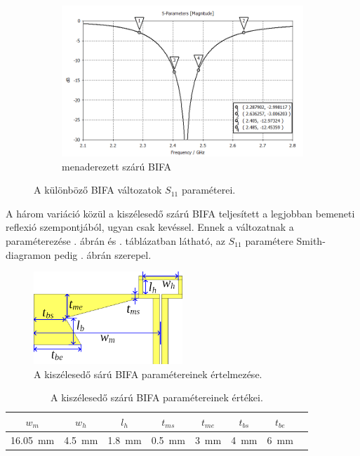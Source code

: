 \begin{figure}[h]
	\hfill
	\begin{subfigure}[b]{0.7\textwidth}
		\centering
		\includegraphics[width=\textwidth]{kep/results/bifa_meandered_S11_dB.png}
		\caption{menaderezett szárú BIFA}
	\end{subfigure}
	\caption{A különböző BIFA változatok $S_{11}$ paraméterei.}
	\label{fig:S11-dB}
\end{figure}
\par A három variáció közül a kiszélesedő szárú BIFA teljesített a legjobban bemeneti reflexió szempontjából, ugyan csak kevéssel. Ennek a változatnak a paraméterezése . ábrán és . táblázatban látható, az $S_{11}$ paramétere Smith-diagramon pedig . ábrán szerepel.
\begin{figure}[h!]
	\centering
	\includegraphics[width=0.5\textwidth]{kep/results/bifa_broadband_params.png}
	\caption{A kiszélesedő sárú BIFA paramétereinek értelmezése.}
	\label{fig:bifa-bb-param}
\end{figure}
\begin{table}[h!]
	\centering
	\begin{tabular}{|c|c|c|c|c|c|c|c|}
	\hline
	$w_{m}$ & $w_{h}$ & $l_{h}$ & $t_{ms}$ & $t_{me}$ & $t_{bs}$ & $t_{be}$ \\
	\hline
	\SI{16,05}{mm} & \SI{4,5}{mm} & \SI{1,8}{mm} & \SI{0,5}{mm} & \SI{3}{mm} & \SI{4}{mm} & \SI{6}{mm}\\
	\hline
	\end{tabular}
	\caption{A kiszélesedő szárú BIFA paramétereinek értékei.}
	\label{tab:bifa-bb-param}
\end{table}
